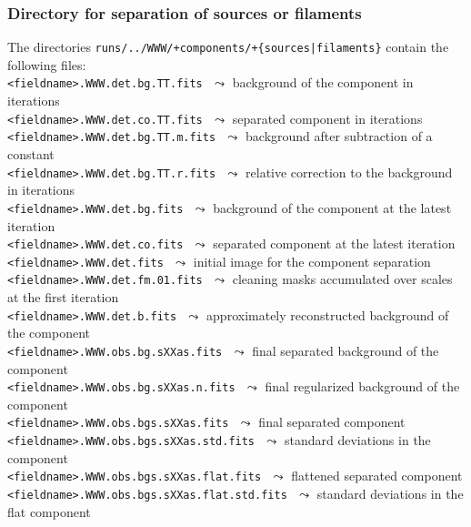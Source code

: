 \documentclass[a4paper,10pt]{article}
\begin{document}
\subsubsection{Directory for separation of sources or filaments}
\label{separate}

The directories \verb!runs/../WWW/+components/+{sources|filaments}! contain the following files:\\

\vspace{-2mm}\noindent
{\small\verb!<fieldname>.WWW.det.bg.TT.fits!} $\,\,\leadsto$ background of the component in iterations\\
{\small\verb!<fieldname>.WWW.det.co.TT.fits!} $\,\,\leadsto$ separated component in iterations\\
{\small\verb!<fieldname>.WWW.det.bg.TT.m.fits!} $\,\,\leadsto$ background after subtraction of a constant\\
{\small\verb!<fieldname>.WWW.det.bg.TT.r.fits!} $\,\,\leadsto$ relative correction to the background in iterations\\
{\small\verb!<fieldname>.WWW.det.bg.fits!} $\,\,\leadsto$ background of the component at the latest iteration\\
{\small\verb!<fieldname>.WWW.det.co.fits!} $\,\,\leadsto$ separated component at the latest iteration\\
{\small\verb!<fieldname>.WWW.det.fits!} $\,\,\leadsto$ initial image for the component separation\\
{\small\verb!<fieldname>.WWW.det.fm.01.fits!} $\,\,\leadsto$ cleaning masks accumulated over scales at the first iteration\\
{\small\verb!<fieldname>.WWW.det.b.fits!} $\,\,\leadsto$ approximately reconstructed background of the component\\
{\small\verb!<fieldname>.WWW.obs.bg.sXXas.fits!} $\,\,\leadsto$ final separated background of the component\\
{\small\verb!<fieldname>.WWW.obs.bg.sXXas.n.fits!} $\,\,\leadsto$ final regularized background of the component\\
{\small\verb!<fieldname>.WWW.obs.bgs.sXXas.fits!} $\,\,\leadsto$ final separated component\\
{\small\verb!<fieldname>.WWW.obs.bgs.sXXas.std.fits!} $\,\,\leadsto$ standard deviations in the component\\
{\small\verb!<fieldname>.WWW.obs.bgs.sXXas.flat.fits!} $\,\,\leadsto$ flattened separated component\\
{\small\verb!<fieldname>.WWW.obs.bgs.sXXas.flat.std.fits!} $\,\,\leadsto$ standard deviations in the flat component\\
\end{document}
